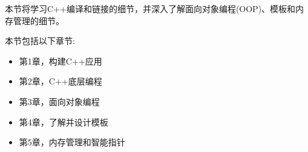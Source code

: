 本节将学习C++编译和链接的细节，并深入了解面向对象编程(OOP)、模板和内存管理的细节。 \par

本节包括以下章节: \par

\begin{itemize}
	\item 第1章，构建C++应用
	\item 第2章，C++底层编程
	\item 第3章，面向对象编程
	\item 第4章，了解并设计模板
	\item 第5章，内存管理和智能指针
\end{itemize}